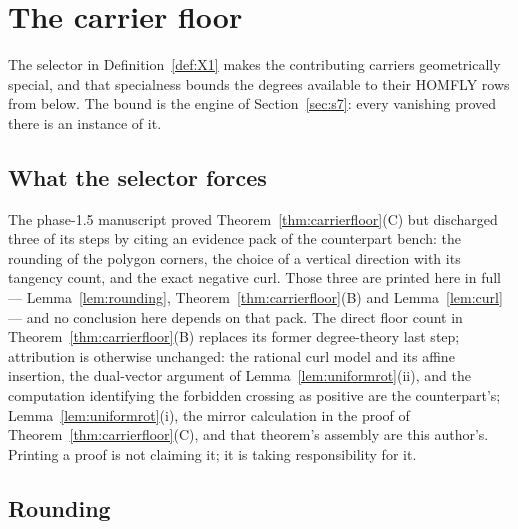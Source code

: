 \section{The carrier floor}\label{sec:floor}

The selector in Definition~\ref{def:X1} makes the contributing carriers
geometrically special, and that specialness bounds the degrees available to
their HOMFLY rows from below. The bound is the engine of Section~\ref{sec:s7}:
every vanishing proved there is an instance of it.

\subsection{What the selector forces}

\begin{remark}\label{rem:floorsources}
The phase-1.5 manuscript proved Theorem~\ref{thm:carrierfloor}(C) but discharged
three of its steps by citing an evidence pack of the counterpart bench: the
rounding of the polygon corners, the choice of a vertical direction with its
tangency count, and the exact negative curl. Those three are printed here in
full --- Lemma~\ref{lem:rounding}, Theorem~\ref{thm:carrierfloor}(B) and Lemma~\ref{lem:curl} ---
and no conclusion here depends on that pack. The direct floor count in
Theorem~\ref{thm:carrierfloor}(B) replaces its former degree-theory last step;
attribution is otherwise unchanged: the rational curl model and its affine
insertion, the dual-vector argument of
Lemma~\ref{lem:uniformrot}(ii), and the computation identifying the forbidden
crossing as positive are the counterpart's; Lemma~\ref{lem:uniformrot}(i), the mirror calculation in the proof of
Theorem~\ref{thm:carrierfloor}(C), and that theorem's assembly are this author's. Printing a proof is not
claiming it; it is taking responsibility for it.
\end{remark}

\subsection{Rounding}

